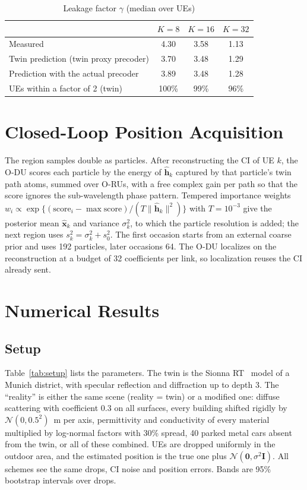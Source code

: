 \documentclass[journal]{IEEEtran}
\newcommand{\vect}[1]{\mathbf{#1}}
\begin{document}
\begin{table}[t]
\centering
\caption{Leakage factor $\gamma$ (median over UEs)}
\label{tab:gamma}
\begin{tabular}{@{}lccc@{}}
\toprule
 & $K=8$ & $K=16$ & $K=32$\\
\midrule
Measured & 4.30 & 3.58 & 1.13\\
Twin prediction (twin proxy precoder) & 3.70 & 3.48 & 1.29\\
Prediction with the actual precoder & 3.89 & 3.48 & 1.28\\
UEs within a factor of 2 (twin) & 100\% & 99\% & 96\%\\
\bottomrule
\end{tabular}
\end{table}

\section{Closed-Loop Position Acquisition}\label{sec:loc}
The region samples double as particles. After reconstructing the CI of UE $k$, the O-DU scores each particle by the energy of $\hat{\vect{h}}_{k}$ captured by that particle's twin path atoms, summed over O-RUs, with a free complex gain per path so that the score ignores the sub-wavelength phase pattern. Tempered importance weights $w_i\propto\exp\{(\mathrm{score}_i-\max\mathrm{score})/(T\|\hat{\vect{h}}_k\|^2)\}$ with $T=10^{-3}$ give the posterior mean $\hat{\vect{x}}_k$ and variance $\sigma_k^2$, to which the particle resolution is added; the next region uses $s_k^2=\sigma_k^2+s_0^2$. The first occasion starts from an external coarse prior and uses 192 particles, later occasions 64. The O-DU localizes on the reconstruction at a budget of 32 coefficients per link, so localization reuses the CI already sent.

\section{Numerical Results}\label{sec:results}

\subsection{Setup}
Table~\ref{tab:setup} lists the parameters. The twin is the Sionna RT~\cite{hoydis2023sionnart} model of a Munich district, with specular reflection and diffraction up to depth 3. The ``reality'' is either the same scene (reality = twin) or a modified one: diffuse scattering with coefficient 0.3 on all surfaces, every building shifted rigidly by $\mathcal{N}(0,0.5^2)$~m per axis, permittivity and conductivity of every material multiplied by log-normal factors with 30\% spread, 40 parked metal cars absent from the twin, or all of these combined. UEs are dropped uniformly in the outdoor area, and the estimated position is the true one plus $\mathcal{N}(\vect{0},\sigma^2\vect{I})$. All schemes see the same drops, CI noise and position errors. Bands are 95\% bootstrap intervals over drops.
\end{document}
